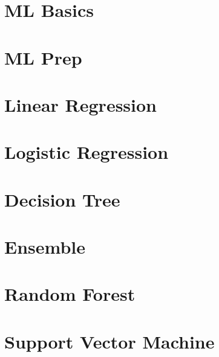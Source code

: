  \section[ML Basics]{ML Basics}





 \section[ML Prep]{ML Prep}




 \section[LinRegr]{Linear Regression}




 \section[LogiRegr]{Logistic Regression}





 \section[Tree]{Decision Tree}



 \section[Ensemble]{Ensemble}



 \section[RandomForest]{Random Forest}




 \section[SVM]{Support Vector Machine}



